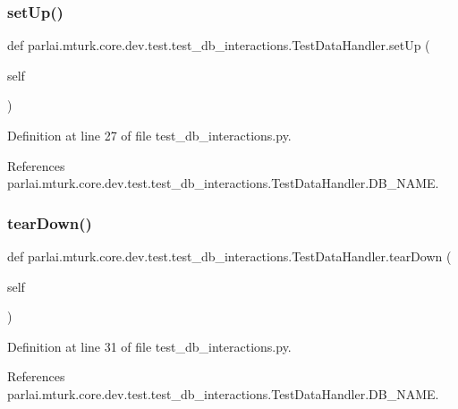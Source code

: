 \subsubsection{\texorpdfstring{set\+Up()}{setUp()}}
{\footnotesize\ttfamily def parlai.\+mturk.\+core.\+dev.\+test.\+test\+\_\+db\+\_\+interactions.\+Test\+Data\+Handler.\+set\+Up (\begin{DoxyParamCaption}\item[{}]{self }\end{DoxyParamCaption})}



Definition at line 27 of file test\+\_\+db\+\_\+interactions.\+py.



References parlai.\+mturk.\+core.\+dev.\+test.\+test\+\_\+db\+\_\+interactions.\+Test\+Data\+Handler.\+D\+B\+\_\+\+N\+A\+ME.

\mbox{\label{classparlai_1_1mturk_1_1core_1_1dev_1_1test_1_1test__db__interactions_1_1TestDataHandler_a211a0ef3f4c89afae8bd62d6b66bb26e}} 
\subsubsection{\texorpdfstring{tear\+Down()}{tearDown()}}
{\footnotesize\ttfamily def parlai.\+mturk.\+core.\+dev.\+test.\+test\+\_\+db\+\_\+interactions.\+Test\+Data\+Handler.\+tear\+Down (\begin{DoxyParamCaption}\item[{}]{self }\end{DoxyParamCaption})}



Definition at line 31 of file test\+\_\+db\+\_\+interactions.\+py.



References parlai.\+mturk.\+core.\+dev.\+test.\+test\+\_\+db\+\_\+interactions.\+Test\+Data\+Handler.\+D\+B\+\_\+\+N\+A\+ME.

